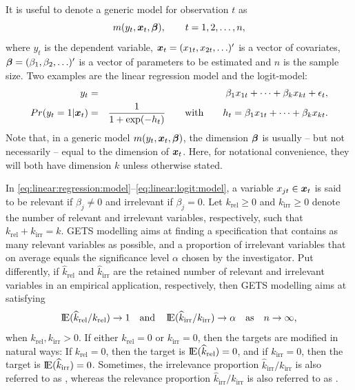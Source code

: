 It is useful to denote a generic model for observation $t$ as
%
\begin{equation}
m(y_t, \boldsymbol{x}_t, \boldsymbol{\beta}), \qquad t=1,2,\ldots,n,
\end{equation}
%
where $y_t$ is the dependent variable, $\boldsymbol{x}_t = (x_{1t}, x_{2t}, \ldots)'$ is a vector of covariates, $\boldsymbol{\beta} = (\beta_1, \beta_2, \ldots)'$ is a vector of parameters to be estimated and $n$ is the sample size. Two examples are the linear regression model and the logit-model:
%
\begin{eqnarray}
	y_t &=& \beta_1 x_{1t} + \cdots + \beta_k x_{kt} + \epsilon_t, \label{eq:linear:regression:model} \\
	Pr(y_t=1|\boldsymbol{x}_t) &=& \frac{1}{1+\exp(-h_t)} \qquad\text{with}\qquad h_t = \beta_1 x_{1t} + \cdots + \beta_k x_{kt}. \label{eq:linear:logit:model}
\end{eqnarray}
%
Note that, in a generic model $m(y_t, \boldsymbol{x}_t, \boldsymbol{\beta})$, the dimension $\boldsymbol{\beta}$ is usually -- but not necessarily -- equal to the dimension of $\boldsymbol{x}_t$. Here, for notational convenience, they will both have dimension $k$ unless otherwise stated.

In \eqref{eq:linear:regression:model}--\eqref{eq:linear:logit:model}, a variable $x_{jt} \in \boldsymbol{x}_t$ is said to be relevant if $\beta_j \neq 0$ and irrelevant if $\beta_j = 0$. Let $k_{\text{rel}} \geq 0$ and $k_{\text{irr}} \geq 0$ denote the number of relevant and irrelevant variables, respectively, such that $k_{\text{rel}} + k_{\text{irr}} = k$. GETS modelling aims at finding a specification that contains as many relevant variables as possible, and a proportion of irrelevant variables that on average equals the significance level $\alpha$ chosen by the investigator. Put differently, if $\widehat{k}_{\text{rel}}$ and $\widehat{k}_{\text{irr}}$ are the retained number of relevant and irrelevant variables in an empirical application, respectively, then GETS modelling aims at satisfying 
%
\begin{equation}\label{eq:asymptotic:gauge:and:potency}
	\E(\widehat{k}_{\text{rel}}/k_{\text{rel}}) \rightarrow 1 \quad \textnormal{and} \quad \E(\widehat{k}_{\text{irr}}/k_{\text{irr}}) \rightarrow \alpha \quad \textnormal{as} \quad n\rightarrow\infty,
\end{equation}
%
when $k_{\text{rel}},k_{\text{irr}}>0$.  If either $k_{\text{rel}}=0$ or $k_{\text{irr}}=0$, then the targets are modified in natural ways: If $k_{\text{rel}}=0$, then the target is $\E(\widehat{k}_{\text{rel}}) = 0$, and if $k_{\text{irr}}=0$, then the target is $\E(\widehat{k}_{\text{irr}}) = 0$. Sometimes, the irrelevance proportion $\widehat{k}_{\text{irr}}/k_{\text{irr}}$ is also referred to as , whereas the relevance proportion $\widehat{k}_{\text{irr}}/k_{\text{irr}}$ is also referred to as .

